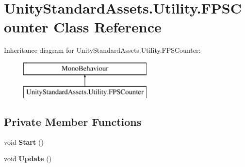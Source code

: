 \hypertarget{class_unity_standard_assets_1_1_utility_1_1_f_p_s_counter}{}\section{Unity\+Standard\+Assets.\+Utility.\+F\+P\+S\+Counter Class Reference}
\label{class_unity_standard_assets_1_1_utility_1_1_f_p_s_counter}
Inheritance diagram for Unity\+Standard\+Assets.\+Utility.\+F\+P\+S\+Counter\+:\begin{figure}[H]
\begin{center}
\leavevmode
\includegraphics[height=2.000000cm]{class_unity_standard_assets_1_1_utility_1_1_f_p_s_counter}
\end{center}
\end{figure}
\subsection*{Private Member Functions}
\begin{DoxyCompactItemize}
\item 
\mbox{\label{class_unity_standard_assets_1_1_utility_1_1_f_p_s_counter_abc26ccb04150a5da9cf759c59d44fc9a}} 
void {\bfseries Start} ()
\item 
\mbox{\label{class_unity_standard_assets_1_1_utility_1_1_f_p_s_counter_abc934eda60e3a8102293938da3a292d4}} 
void {\bfseries Update} ()
\end{DoxyCompactItemize}
